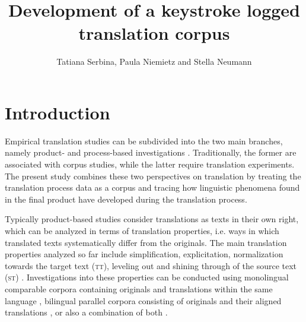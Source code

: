 \documentclass[output=paper]{LSP/langsci}
\author{Tatiana Serbina, Paula Niemietz and Stella Neumann}
\title{Development of a keystroke logged translation corpus}
\begin{document}
 
\section{Introduction} \label{sec:1:1}
Empirical translation studies can be subdivided into the two main branches, namely product- and process-based investigations \citep[see][]{Laviosa2002,Göpferich2008}. Traditionally, the former are associated with corpus studies, while the latter require translation experiments. The present study combines these two perspectives on translation by treating the translation process data as a corpus and tracing how linguistic phenomena found in the final product have developed during the translation process.

Typically product-based studies consider translations as texts in their own right, which can be analyzed in terms of translation properties, i.e. ways in which translated texts systematically differ from the originals. The main translation properties analyzed so far include simplification, explicitation, normalization towards the target text (\textsc{tt}), leveling out \citep{Baker1996} and shining through of the source text (\textsc{st}) \citep{Teich2003}. Investigations into these properties can be conducted using monolingual comparable corpora containing originals and translations within the same language \citep[e.g.][]{Laviosa2002}, bilingual parallel corpora consisting of originals and their aligned translations \citep[e.g][]{Becher2010}, or also a combination of both \citep{Culo2012,Hansen-Schirra2012}.
\end{document}
